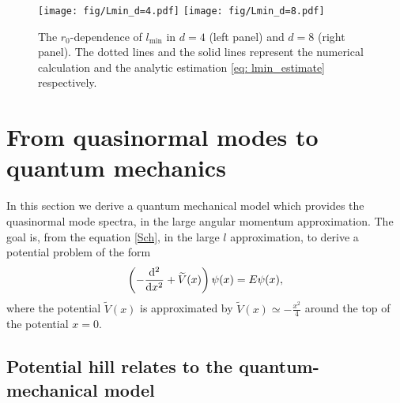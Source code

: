 \documentclass[a4paper,11pt]{article}
\begin{document}
\begin{figure}[t]
    \centering
    \texttt{[image: fig/Lmin\_d=4.pdf]}
    \texttt{[image: fig/Lmin\_d=8.pdf]}
    \caption{The $r_0$-dependence of $l_\mathrm{min}$ in $d=4$ (left panel) and $d=8$ (right panel).
    The dotted lines and the solid lines represent the numerical calculation and the analytic estimation \eqref{eq: lmin_estimate} respectively.}
    \label{fig: lmin_estimation}
\end{figure}






\section{From quasinormal modes to quantum mechanics}
\label{sec:3}

In this section we derive a quantum mechanical model which provides the quasinormal mode spectra, in the large angular momentum approximation.
The goal is, from the equation \eqref{Sch}, in the large $l$ approximation, 
to derive a potential problem of the form
\begin{align}
    \left(
	-\dv[2]{x} + \widetilde{V}(x)
    \right) \psi(x)
    = E\psi(x),
    \label{QM}
\end{align}
where the potential $\widetilde{V}(x)$ is approximated by 
$\widetilde{V}(x) \simeq - \frac{x^2}{4}$ around the top of the potential $x=0$.

\subsection{Potential hill relates to the quantum-mechanical model}
\end{document}
